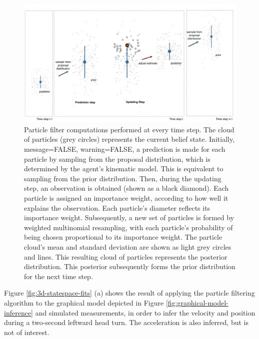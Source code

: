 \documentclass[english,floatsintext,man]{apa6}
\theoremstyle{definition}
\theoremstyle{definition}
\theoremstyle{remark}
\begin{document}
\begin{figure}
\centering
\includegraphics{diagrams/figure-particle-filter-explained.pdf}
\caption{\label{fig:particle-filter-explained}Particle filter computations
performed at every time step. The cloud of particles (grey circles)
represents the current belief state. Initially, message=FALSE,
warning=FALSE, a prediction is made for each particle by sampling from
the proposal distribution, which is determined by the agent's kinematic
model. This is equivalent to sampling from the prior distribution. Then,
during the updating step, an observation is obtained (shown as a black
diamond). Each particle is assigned an importance weight, according to
how well it explains the observation. Each particle's diameter reflects
its importance weight. Subsequently, a new set of particles is formed by
weighted multinomial resampling, with each particle's probability of
being chosen proportional to its importance weight. The particle cloud's
mean and standard deviation are shown as light grey circles and lines.
This resulting cloud of particles represents the posterior distribution.
This posterior subsequently forms the prior distribution for the next
time step.}
\end{figure}

Figure \ref{fig:3d-statespace-fits} (a) shows the result of applying the
particle filtering algorithm to the graphical model depicted in Figure
\ref{fig:graphical-model-inference} and simulated measurements, in order
to infer the velocity and position during a two-second leftward head
turn. The acceleration is also inferred, but is not of interest.
\end{document}
